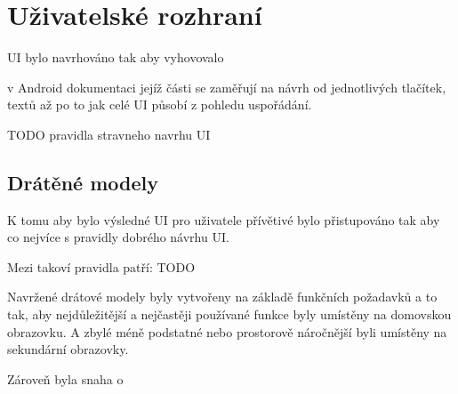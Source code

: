 
\section{Uživatelské rozhraní}
UI bylo navrhováno tak aby vyhovovalo 

v Android dokumentaci jejíž části se zaměřují na návrh od jednotlivých tlačítek, textů až po to jak celé UI působí z pohledu
uspořádání.



TODO pravidla stravneho navrhu UI

\subsection{Drátěné modely} \label{navrhWireframes}
K tomu aby bylo výsledné UI pro uživatele přívětivé bylo přistupováno tak aby co nejvíce  s pravidly dobrého návrhu UI.

Mezi takoví pravidla patří:
TODO

Navržené drátové modely byly vytvořeny na základě funkčních požadavků a to tak, aby nejdůležitější a nejčastěji používané funkce byly 
umístěny na domovskou obrazovku. A zbylé méně podstatné nebo prostorově náročnější byli umístěny na sekundární obrazovky.

Zároveň byla snaha o 


